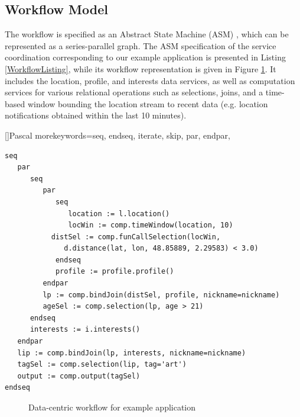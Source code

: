 \subsection{Workflow Model}\label{subsec:workflowModel}

The workflow is specified as an Abstract State Machine (ASM) \cite{Gurevich:1995:EAL:233976.233979}, which can be represented as a series-parallel graph. The ASM specification of the service coordination corresponding to our example application is presented in Listing \ref{WorkflowListing}, while its workflow representation is given in Figure \ref{fig:servCoorExample}. It includes the location, profile, and interests data services, as well as computation services for various relational operations such as selections, joins, and a time-based window bounding the location stream to recent data (e.g. location notifications obtained within the last 10 minutes).

[]{Pascal}{
   morekeywords={seq, endseq, iterate, skip, par, endpar},
}

\lstset{language=AbStM,showstringspaces=false}
\begin{lstlisting}[caption={ASM specification for example application},label=WorkflowListing]
seq
   par
      seq
         par
            seq
               location := l.location()
               locWin := comp.timeWindow(location, 10)
	       distSel := comp.funCallSelection(locWin, 
	          d.distance(lat, lon, 48.85889, 2.29583) < 3.0)
            endseq
            profile := profile.profile()
         endpar
         lp := comp.bindJoin(distSel, profile, nickname=nickname)
         ageSel := comp.selection(lp, age > 21)
      endseq
      interests := i.interests()
   endpar
   lip := comp.bindJoin(lp, interests, nickname=nickname)
   tagSel := comp.selection(lip, tag='art')
   output := comp.output(tagSel)
endseq
\end{lstlisting}

\begin{figure}
	\centering
		\caption{Data-centric workflow for example application}
		\label{fig:servCoorExample}
\end{figure}

